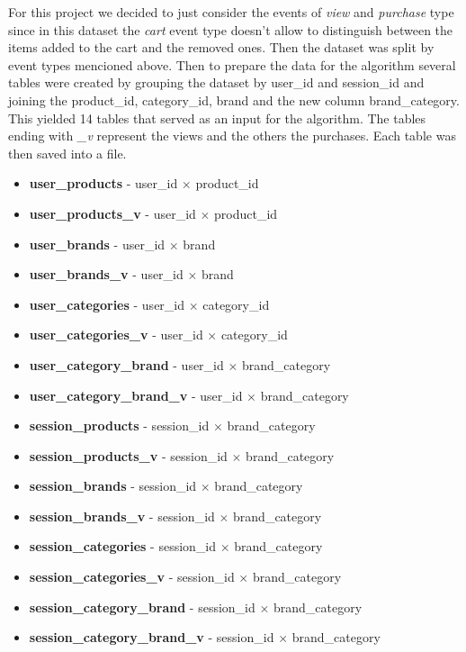 For this project we decided to just consider the events of \textit{view} and \textit{purchase} type since 
in this dataset the \textit{cart} event type doesn't allow to distinguish between the items added to the cart and the removed ones.
Then the dataset was split by event types mencioned above. Then to prepare the data for the algorithm several tables were created by grouping the dataset by user\_id and session\_id and
joining the product\_id, category\_id, brand and the new column brand\_category.
This yielded 14 tables that served as an input for the algorithm.
The tables ending with \textit{\_v} represent the views and the others the purchases.
Each table was then saved into a file.
\begin{itemize}
    \item \textbf{user\_products} - user\_id $\times$ product\_id
    \item \textbf{user\_products\_v} - user\_id $\times$ product\_id
    \item \textbf{user\_brands} - user\_id $\times$ brand
    \item \textbf{user\_brands\_v} - user\_id $\times$ brand
    \item \textbf{user\_categories} - user\_id $\times$ category\_id
    \item \textbf{user\_categories\_v} - user\_id $\times$ category\_id
    \item \textbf{user\_category\_brand} - user\_id $\times$ brand\_category
    \item \textbf{user\_category\_brand\_v} - user\_id $\times$ brand\_category
    \item \textbf{session\_products} - session\_id $\times$ brand\_category
    \item \textbf{session\_products\_v} - session\_id $\times$ brand\_category
    \item \textbf{session\_brands} - session\_id $\times$ brand\_category
    \item \textbf{session\_brands\_v} - session\_id $\times$ brand\_category
    \item \textbf{session\_categories} - session\_id $\times$ brand\_category
    \item \textbf{session\_categories\_v} - session\_id $\times$ brand\_category
    \item \textbf{session\_category\_brand} - session\_id $\times$ brand\_category
    \item \textbf{session\_category\_brand\_v} - session\_id $\times$ brand\_category
\end{itemize}